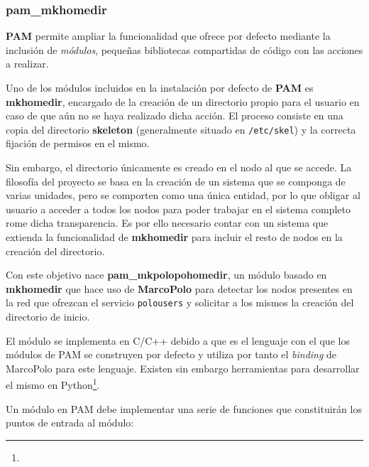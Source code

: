 \subsubsection{pam\_mkhomedir}
\label{mkpolohomedir}

\textbf{PAM} permite ampliar la funcionalidad que ofrece por defecto mediante la inclusión de \textit{módulos}, pequeñas bibliotecas compartidas de código con las acciones a realizar.

Uno de los módulos incluidos en la instalación por defecto de \textbf{PAM} es \textbf{mkhomedir}, encargado de la creación de un directorio propio para el usuario en caso de que aún no se haya realizado dicha acción. El proceso consiste en una copia del directorio \textbf{skeleton} (generalmente situado en \texttt{/etc/skel}) y la correcta fijación de permisos en el mismo.

Sin embargo, el directorio únicamente es creado en el nodo al que se accede. La filosofía del proyecto se basa en la creación de un sistema que se componga de varias unidades, pero se comporten como una única entidad, por lo que obligar al usuario a acceder a todos los nodos para poder trabajar en el sistema completo rome dicha transparencia. Es por ello necesario contar con un sistema que extienda la funcionalidad de \textbf{mkhomedir} para incluir el resto de nodos en la creación del directorio.

Con este objetivo nace \textbf{pam\_mkpolopohomedir}, un módulo basado en \textbf{mkhomedir} que hace uso de \textbf{MarcoPolo} para detectar los nodos presentes en la red que ofrezcan el servicio \texttt{polousers} y solicitar a los mismos la creación del directorio de inicio.

El módulo se implementa en C/C++ debido a que es el lenguaje con el que los módulos de PAM se construyen por defecto y utiliza por tanto el \textit{binding} de MarcoPolo para este lenguaje. Existen sin embargo herramientas para desarrollar el mismo en Python\footnote{}.

Un módulo en PAM debe implementar una serie de funciones que constituirán los puntos de entrada al módulo:

